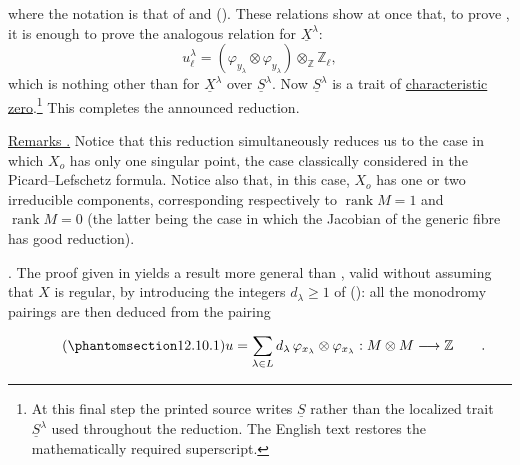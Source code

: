 \noindent
where the notation is that of  and (). These relations show
at once that, to prove , it is enough to prove the analogous
relation for $\underline X^\lambda$:
\[
 u_\ell^\lambda=
 (\varphi_{y_\lambda}\otimes\varphi_{y_\lambda})
 \otimes_{\mathbb Z}\mathbb Z_\ell,
\]
which is nothing other than  for $\underline X^\lambda$ over
$\underline S^\lambda$. Now $\underline S^\lambda$ is a trait of
\underline{characteristic zero}.\footnote{At this final step the printed
source writes $\underline S$ rather than the localized trait
$\underline S^\lambda$ used throughout the reduction. The English text
restores the mathematically required superscript.} This completes the
announced reduction.

\medskip
\noindent
\underline{Remarks .} Notice that this reduction simultaneously
reduces us to the case in which $X_o$ has only one singular point, the case
classically considered in the Picard--Lefschetz formula. Notice also that,
in this case, $X_o$ has one or two irreducible components, corresponding
respectively to $\operatorname{rank}M=1$ and $\operatorname{rank}M=0$ (the
latter being the case in which the Jacobian of the generic fibre has good
reduction).

\medskip
\noindent
{}. The proof given in  yields a result more general than ,
valid without assuming that $X$ is regular, by introducing the integers
$d_\lambda\geqslant1$ of (): all the monodromy pairings are then
deduced from the pairing

\begin{equation}\tag{\SGARefTarget{sga7.sga7i.eix.n12-10-1}{12.10.1}}
 u=\sum_{\lambda\in L}d_\lambda\,
   \varphi_{x_\lambda}\otimes\varphi_{x_\lambda}:
   M\otimes M\longrightarrow\mathbb Z\qquad .
\end{equation}
